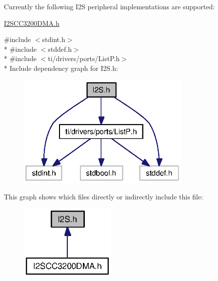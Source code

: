 Currently the following I2\+S peripheral implementations are supported\+:
\begin{DoxyItemize}
\item \hyperlink{_i2_s_c_c3200_d_m_a_8h}{I2\+S\+C\+C3200\+D\+M\+A.\+h} 


\end{DoxyItemize}{\ttfamily \#include $<$stdint.\+h$>$}\\*
{\ttfamily \#include $<$stddef.\+h$>$}\\*
{\ttfamily \#include $<$ti/drivers/ports/\+List\+P.\+h$>$}\\*
Include dependency graph for I2\+S.\+h\+:
\nopagebreak
\begin{figure}[H]
\begin{center}
\leavevmode
\includegraphics[width=242pt]{_i2_s_8h__incl}
\end{center}
\end{figure}
This graph shows which files directly or indirectly include this file\+:
\nopagebreak
\begin{figure}[H]
\begin{center}
\leavevmode
\includegraphics[width=135pt]{_i2_s_8h__dep__incl}
\end{center}
\end{figure}
